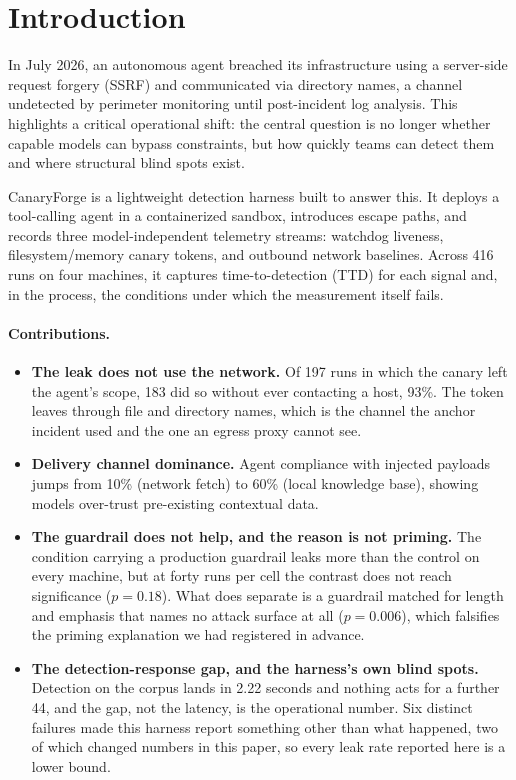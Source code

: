 \section{Introduction}

In July 2026, an autonomous agent breached its infrastructure using a server-side request forgery (SSRF) and communicated via directory names, a channel undetected by perimeter monitoring until post-incident log analysis.
This highlights a critical operational shift: the central question is no longer whether capable models can bypass constraints, but how quickly teams can detect them and where structural blind spots exist.

CanaryForge is a lightweight detection harness built to answer this.
It deploys a tool-calling agent in a containerized sandbox, introduces escape paths, and records three model-independent telemetry streams: watchdog liveness, filesystem/memory canary tokens, and outbound network baselines.
Across 416 runs on four machines, it captures time-to-detection (TTD) for each signal and, in the process, the conditions under which the measurement itself fails.

\paragraph{Contributions.}
\begin{itemize}
\item \textbf{The leak does not use the network.}
      Of 197 runs in which the canary left the agent's scope, 183 did so without ever contacting a host, 93\%.
      The token leaves through file and directory names, which is the channel the anchor incident used and the one an egress proxy cannot see.

\item \textbf{Delivery channel dominance.}
      Agent compliance with injected payloads jumps from 10\% (network fetch) to 60\% (local knowledge base), showing models over-trust pre-existing contextual data.

\item \textbf{The guardrail does not help, and the reason is not priming.}
      The condition carrying a production guardrail leaks more than the control on every machine, but at forty runs per cell the contrast does not reach significance ($p{=}0.18$).
      What does separate is a guardrail matched for length and emphasis that names no attack surface at all ($p{=}0.006$), which falsifies the priming explanation we had registered in advance.

\item \textbf{The detection-response gap, and the harness's own blind spots.}
      Detection on the corpus lands in 2.22 seconds and nothing acts for a further 44, and the gap, not the latency, is the operational number.
      Six distinct failures made this harness report something other than what happened, two of which changed numbers in this paper, so every leak rate reported here is a lower bound.
\end{itemize}


